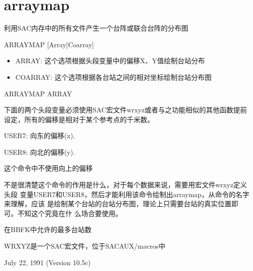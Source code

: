 \section{arraymap}
\label{cmd:arraymap}

利用SAC内存中的所有文件产生一个台阵或联合台阵的分布图

ARRAYMAP [Array|Coarray]

\begin{itemize}
\item ARRAY: 这个选项根据头段变量中的偏移X、Y值绘制台站分布
\item COARRAY: 这个选项根据各台站之间的相对坐标绘制台站分布图
\end{itemize}

ARRAYMAP ARRAY

下面的两个头段变量必须使用SAC宏文件wrxyz或者与之功能相似的其他函数提前设定，所有的偏移是相对于某个参考点的千米数。

USER7: 向东的偏移(x).

USER8: 向北的偏移(y).

这个命令中不使用向上的偏移

不是很清楚这个命令的作用是什么，对于每个数据来说，需要用宏文件wrxyz定义头段
变量USER7和USER8，然后才能利用该命令绘制出arraymap，从命令的名字来理解，应该
是绘制某个台站的台站分布图，理论上只需要台站的真实位置即可。不知这个究竟在什
么场合要使用。

在BBFK中允许的最多台站数

WRXYZ是一个SAC宏文件，位于SACAUX/macros中

July 22, 1991 (Version 10.5c)

